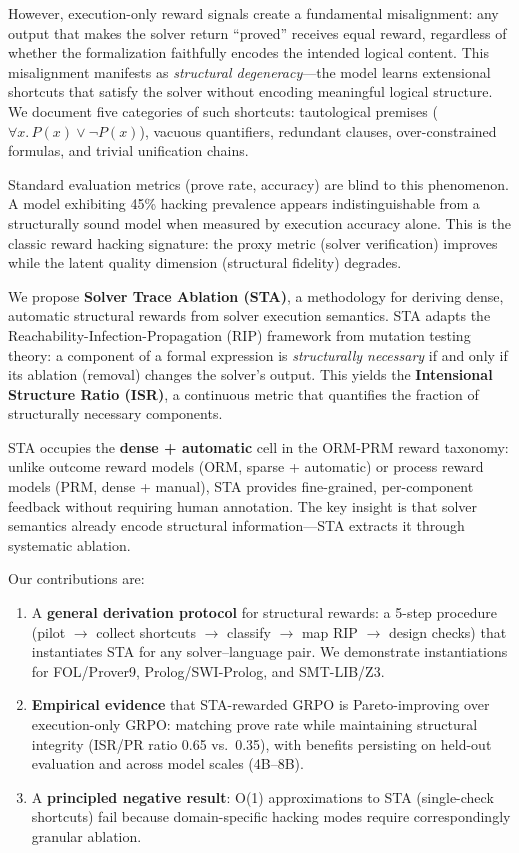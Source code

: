 \documentclass[11pt,a4paper]{article}
\begin{document}
However, execution-only reward signals create a fundamental misalignment: any output that makes the solver return ``proved'' receives equal reward, regardless of whether the formalization faithfully encodes the intended logical content. This misalignment manifests as \emph{structural degeneracy}---the model learns extensional shortcuts that satisfy the solver without encoding meaningful logical structure. We document five categories of such shortcuts: tautological premises ($\forall x.\, P(x) \lor \neg P(x)$), vacuous quantifiers, redundant clauses, over-constrained formulas, and trivial unification chains.

Standard evaluation metrics (prove rate, accuracy) are blind to this phenomenon. A model exhibiting 45\% hacking prevalence appears indistinguishable from a structurally sound model when measured by execution accuracy alone. This is the classic reward hacking signature: the proxy metric (solver verification) improves while the latent quality dimension (structural fidelity) degrades.

We propose \textbf{Solver Trace Ablation (STA)}, a methodology for deriving dense, automatic structural rewards from solver execution semantics. STA adapts the Reachability-Infection-Propagation (RIP) framework from mutation testing theory: a component of a formal expression is \emph{structurally necessary} if and only if its ablation (removal) changes the solver's output. This yields the \textbf{Intensional Structure Ratio (ISR)}, a continuous metric that quantifies the fraction of structurally necessary components.

STA occupies the \textbf{dense + automatic} cell in the ORM-PRM reward taxonomy: unlike outcome reward models (ORM, sparse + automatic) or process reward models (PRM, dense + manual), STA provides fine-grained, per-component feedback without requiring human annotation. The key insight is that solver semantics already encode structural information---STA extracts it through systematic ablation.

Our contributions are:
\begin{enumerate}
\item A \textbf{general derivation protocol} for structural rewards: a 5-step procedure (pilot $\to$ collect shortcuts $\to$ classify $\to$ map RIP $\to$ design checks) that instantiates STA for any solver--language pair. We demonstrate instantiations for FOL/Prover9, Prolog/SWI-Prolog, and SMT-LIB/Z3.
\item \textbf{Empirical evidence} that STA-rewarded GRPO is Pareto-improving over execution-only GRPO: matching prove rate while maintaining structural integrity (ISR/PR ratio 0.65 vs.\ 0.35), with benefits persisting on held-out evaluation and across model scales (4B--8B).
\item A \textbf{principled negative result}: O(1) approximations to STA (single-check shortcuts) fail because domain-specific hacking modes require correspondingly granular ablation.
\end{enumerate}
\end{document}
